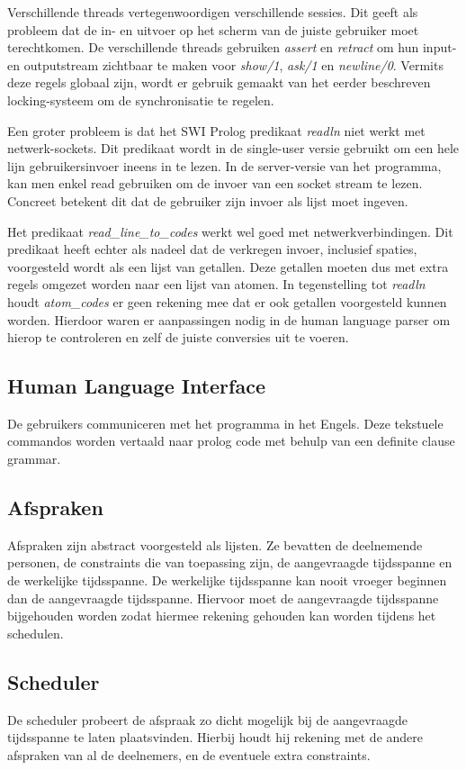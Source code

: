 \documentclass[a4paper]{article}
\begin{document}
Verschillende threads vertegenwoordigen verschillende sessies.
Dit geeft als probleem dat de in- en uitvoer op het scherm van de juiste gebruiker moet terechtkomen.
De verschillende threads gebruiken {\em assert} en {\em retract} om hun input- en outputstream zichtbaar te maken voor {\em show/1}, {\em ask/1} en {\em newline/0}. 
Vermits deze regels globaal zijn, wordt er gebruik gemaakt van het eerder beschreven locking-systeem om de synchronisatie te regelen.

Een groter probleem is dat het SWI Prolog predikaat {\em readln} niet werkt met netwerk-sockets.
Dit predikaat wordt in de single-user versie gebruikt om een hele lijn gebruikersinvoer ineens in te lezen.
In de server-versie van het programma, kan men enkel read gebruiken om de invoer van een socket stream te lezen.
Concreet betekent dit dat de gebruiker zijn invoer als lijst moet ingeven.

Het predikaat {\em read\_line\_to\_codes} werkt wel goed met netwerkverbindingen.
Dit predikaat heeft echter als nadeel dat de verkregen invoer, inclusief spaties, voorgesteld wordt als een lijst van getallen.
Deze getallen moeten dus met extra regels omgezet worden naar een lijst van atomen.
In tegenstelling tot {\em readln} houdt {\em atom\_codes} er geen rekening mee dat er ook getallen voorgesteld kunnen worden.
Hierdoor waren er aanpassingen nodig in de human language parser om hierop te controleren en zelf de juiste conversies uit te voeren.

\subsection{Human Language Interface}
De gebruikers communiceren met het programma in het Engels.
Deze tekstuele commandos worden vertaald naar prolog code met behulp van een definite clause grammar.

\subsection{Afspraken}
Afspraken zijn abstract voorgesteld als lijsten.
Ze bevatten de deelnemende personen, de constraints die van toepassing zijn, de aangevraagde tijdsspanne en de werkelijke tijdsspanne.
De werkelijke tijdsspanne kan nooit vroeger beginnen dan de aangevraagde tijdsspanne.
Hiervoor moet de aangevraagde tijdsspanne bijgehouden worden zodat hiermee rekening gehouden kan worden tijdens het schedulen.

\subsection{Scheduler}
De scheduler probeert de afspraak zo dicht mogelijk bij de aangevraagde tijdsspanne te laten plaatsvinden.
Hierbij houdt hij rekening met de andere afspraken van al de deelnemers, en de eventuele extra constraints.
\end{document}
